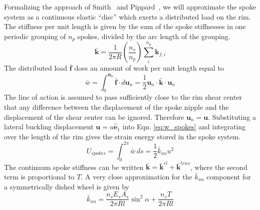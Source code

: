 \documentclass{bmd2016p}
\newcommand{\e}{\ensuremath{\hat{\bm{e}}_1}}
\begin{document}
Formalizing the approach of Smith~\cite{Smith1901a} and Pippard~\cite{Pippard1932d}, we will approximate the spoke system as a continuous elastic ``disc'' which exerts a distributed load on the rim. The stiffness per unit length is given by the sum of the spoke stiffnesses in one periodic grouping of $n_p$ spokes, divided by the arc length of the grouping.
	\begin{equation}\label{eq:kbar}
	\bar{\bm{k}} = \frac{1}{2\pi R}\left(\frac{n_s}{n_p}\right) \sum_i^{n_p} \bm{k}_{f, i}
	\end{equation}
	The distributed load $\bar{\bm{f}}$ does an amount of work per unit length equal to
	\begin{equation}\label{eq:w_spokes}
	\bar{w} = \int_0^{\bm{u}_n} \bar{\bm{f}} \cdot d\bm{u}_n = \frac{1}{2} \bm{u}_n \cdot \bar{\bm{k}} \cdot \bm{u}_n
	\end{equation}
The line of action is assumed to pass sufficiently close to the rim shear center that any difference between the displacement of the spoke nipple and the displacement of the shear center can be ignored. Therefore $\bm{u}_n = \bm{u}$. Substituting a lateral buckling displacement $\bm{u}=u\e$ into Eqn. \ref{eq:w_spokes} and integrating over the length of the rim gives the strain energy stored in the spoke system.
	\begin{equation}\label{eq:Us}
	U_{spokes} = \int_0^{2\pi} \bar{w} \, ds = \frac{1}{2} \bar{k}_{uu}u^2
	\end{equation}
The continuum spoke stiffness can be written $\bar{\bm{k}} = \bar{\bm{k}}^{el} + \bar{\bm{k}}^{tens}$, where the second term is proportional to $T$. A very close approximation for the $\bar{k}_{uu}$ component for a symmetrically dished wheel is given by
	\begin{equation}\label{eq:kuu}
	\bar{k}_{uu} = \frac{n_sE_sA_s}{2\pi Rl}\sin^2{\alpha} + \frac{n_s T}{2\pi Rl}
	\end{equation}
\end{document}
